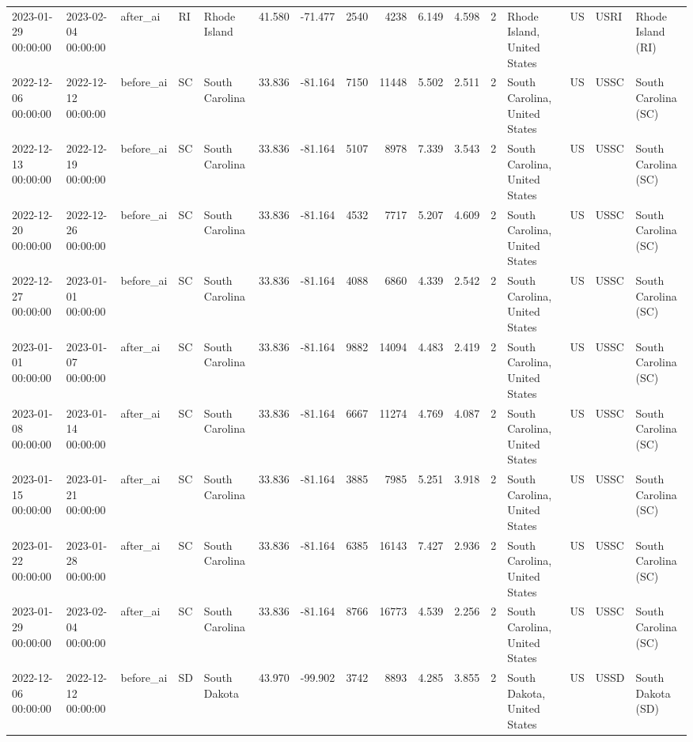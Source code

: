 \begin{tabular}{lllllrrrrrrlllll}
2023-01-29 00:00:00 & 2023-02-04 00:00:00 & after\_ai & RI & Rhode Island & 41.580 & -71.477 & 2540 & 4238 & 6.149 & 4.598 & 2 & Rhode Island, United States & US & USRI & Rhode Island (RI) \\
2022-12-06 00:00:00 & 2022-12-12 00:00:00 & before\_ai & SC & South Carolina & 33.836 & -81.164 & 7150 & 11448 & 5.502 & 2.511 & 2 & South Carolina, United States & US & USSC & South Carolina (SC) \\
2022-12-13 00:00:00 & 2022-12-19 00:00:00 & before\_ai & SC & South Carolina & 33.836 & -81.164 & 5107 & 8978 & 7.339 & 3.543 & 2 & South Carolina, United States & US & USSC & South Carolina (SC) \\
2022-12-20 00:00:00 & 2022-12-26 00:00:00 & before\_ai & SC & South Carolina & 33.836 & -81.164 & 4532 & 7717 & 5.207 & 4.609 & 2 & South Carolina, United States & US & USSC & South Carolina (SC) \\
2022-12-27 00:00:00 & 2023-01-01 00:00:00 & before\_ai & SC & South Carolina & 33.836 & -81.164 & 4088 & 6860 & 4.339 & 2.542 & 2 & South Carolina, United States & US & USSC & South Carolina (SC) \\
2023-01-01 00:00:00 & 2023-01-07 00:00:00 & after\_ai & SC & South Carolina & 33.836 & -81.164 & 9882 & 14094 & 4.483 & 2.419 & 2 & South Carolina, United States & US & USSC & South Carolina (SC) \\
2023-01-08 00:00:00 & 2023-01-14 00:00:00 & after\_ai & SC & South Carolina & 33.836 & -81.164 & 6667 & 11274 & 4.769 & 4.087 & 2 & South Carolina, United States & US & USSC & South Carolina (SC) \\
2023-01-15 00:00:00 & 2023-01-21 00:00:00 & after\_ai & SC & South Carolina & 33.836 & -81.164 & 3885 & 7985 & 5.251 & 3.918 & 2 & South Carolina, United States & US & USSC & South Carolina (SC) \\
2023-01-22 00:00:00 & 2023-01-28 00:00:00 & after\_ai & SC & South Carolina & 33.836 & -81.164 & 6385 & 16143 & 7.427 & 2.936 & 2 & South Carolina, United States & US & USSC & South Carolina (SC) \\
2023-01-29 00:00:00 & 2023-02-04 00:00:00 & after\_ai & SC & South Carolina & 33.836 & -81.164 & 8766 & 16773 & 4.539 & 2.256 & 2 & South Carolina, United States & US & USSC & South Carolina (SC) \\
2022-12-06 00:00:00 & 2022-12-12 00:00:00 & before\_ai & SD & South Dakota & 43.970 & -99.902 & 3742 & 8893 & 4.285 & 3.855 & 2 & South Dakota, United States & US & USSD & South Dakota (SD) \\

\end{tabular}
